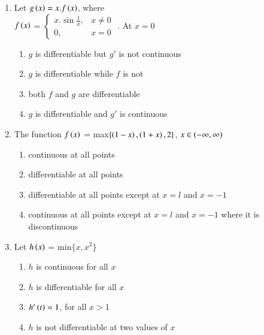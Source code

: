 \documentclass[journal,12pt,twocolumn]{IEEEtran}
\theoremstyle{remark}
\begin{document}
\begin{enumerate}
    \item 
    {Let $g\left(x\right)=x.f\left(x\right)$, where\\[6pt] $f\left(x\right)$ = $\begin{cases}
        x.\sin\frac{1}{x}, & x\neq 0\\
        0, & x=0
    \end{cases}$
    . At $x=0$} \\
    
    \hfill 
    {}
    
    \begin{enumerate}[label=(\alph*)]
        
        \item $g$ is differentiable but $g'$ is not continuous
        \item $g$ is differentiable while $f$ is not
        \item both $f$ and $g$ are differentiable
        \item $g$ is differentiable and $g'$ is continuous 
    \end{enumerate}

    \item 
     {The function $f\left(x\right)$ = max$\{\left(1-x\right),\left(1+x\right),2\}$, $x\in \left(-\infty,\infty\right)$} \\

    \hfill 
    {}
    
    \begin{enumerate}[label=(\alph*)]
        
        \item continuous at all points
        \item differentiable at all points
        \item differentiable at all points except at $x=l$ and $x=-1$
        \item continuous at all points except at $x=l$ and $x=-1$ where it is discontinuous
    \end{enumerate}


    \item 
    Let $h\left(x\right)$ = min$\{x,x^{2}\}$ \\

    \hfill 
    {}

    \begin{enumerate}[label=(\alph*)]
        
        \item $h$ is continuous for all $x$
        \item $h$ is differentiable for all $x$
        \item $h'\left(t\right)=1$, for all $x >1$
        \item $h$ is not differentiable at two values of $x$
    \end{enumerate}



\end{enumerate}
\end{document}
